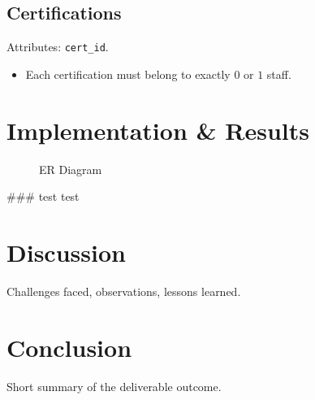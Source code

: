 \documentclass[a4paper,12pt]{article}
\begin{document}
\subsection*{Certifications}
Attributes: \texttt{cert\_id}.
\begin{itemize}
    \item Each certification must belong to exactly $0$ or $1$ staff.
\end{itemize}
\section{Implementation \& Results}
\begin{figure}[htbp]
    \caption{ER Diagram}
    \label{fig:ERD}
\end{figure}

\newpage


### test test

\section{Discussion}
Challenges faced, observations, lessons learned.

\section{Conclusion}
Short summary of the deliverable outcome.
\end{document}
